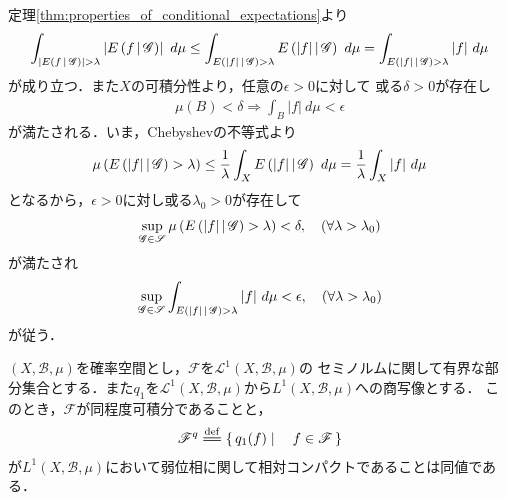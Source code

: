 	\begin{prf}
		定理\ref{thm:properties_of_conditional_expectations}より
				\begin{align}
					\int_{\left| \cexp{f}{\mathscr{G}} \right| > \lambda} \left| \cexp{f}{\mathscr{G}} \right|\ d\mu
					\leq \int_{\cexp{|f|}{\mathscr{G}} > \lambda} \cexp{|f|}{\mathscr{G}}\ d\mu
					= \int_{\cexp{|f|}{\mathscr{G}} > \lambda} |f|\ d\mu
				\end{align}
				が成り立つ．また$X$の可積分性より，任意の$\epsilon > 0$に対して
				或る$\delta > 0$が存在し
				\begin{align}
					\mu(B) < \delta \Rightarrow \int_B |f|\ d\mu < \epsilon
				\end{align}
				が満たされる．いま，Chebyshevの不等式より
				\begin{align}
					\mu\left( E\left( |f| \, \middle|\, \mathscr{G} \right) > \lambda \right)
					\leq \frac{1}{\lambda} \int_X E\left( |f| \, \middle|\, \mathscr{G} \right)\ d\mu
					= \frac{1}{\lambda} \int_X |f|\ d\mu
				\end{align}
				となるから，$\epsilon > 0$に対し或る$\lambda_0 > 0$が存在して
				\begin{align}
					\operatorname*{sup}_{\mathscr{G} \in \mathscr{S}} \mu\left( E\left( |f| \, \middle|\, \mathscr{G} \right) > \lambda \right)
					< \delta,
					\quad (\forall \lambda > \lambda_0)
				\end{align}
				が満たされ
				\begin{align}
					\operatorname*{sup}_{\mathscr{G} \in \mathscr{S}} \int_{E\left( |f| \, \middle|\, \mathscr{G} \right) > \lambda}|f|\ d\mu
					< \epsilon,
					\quad (\forall \lambda > \lambda_0)
				\end{align}
				が従う．
		\QED
	\end{prf}
	
	\begin{screen}
		\begin{thm}\label{thm:Dunford_Pettis}
			$(X,\mathcal{B},\mu)$を確率空間とし，$\mathscr{F}$を$\mathscr{L}^1(X,\mathcal{B},\mu)$の
			セミノルムに関して有界な部分集合とする．また$q_1$を$\mathscr{L}^1(X,\mathcal{B},\mu)$から$L^1(X,\mathcal{B},\mu)$への商写像とする．
			このとき，$\mathscr{F}$が同程度可積分であることと，
			\begin{align}
				\mathscr{F}^q \defeq \Set{q_1(f)}{f \in \mathscr{F}}
			\end{align}
			が$L^1(X,\mathcal{B},\mu)$において弱位相に関して相対コンパクトであることは同値である．
		\end{thm}
	\end{screen}
	
